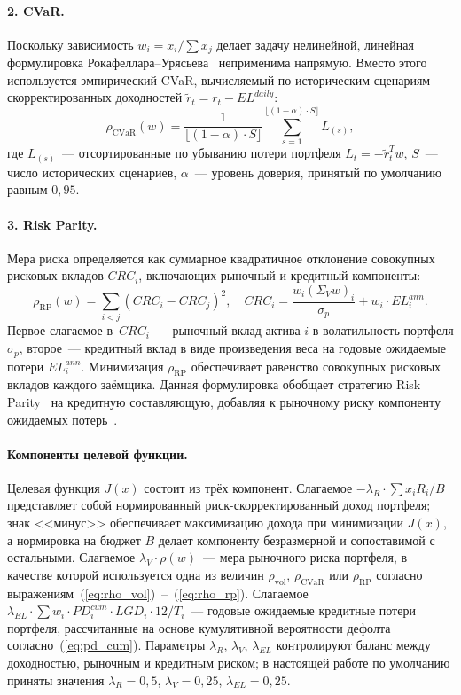 \documentclass[]{article}
\begin{document}
	\paragraph{2. CVaR.}
	Поскольку зависимость $w_i = x_i / \sum x_j$ делает задачу нелинейной, линейная формулировка
	Рокафеллара--Урясьева~\cite{rockafellar2000} неприменима напрямую. Вместо этого используется
	эмпирический CVaR, вычисляемый по историческим сценариям скорректированных доходностей
	$\tilde{r}_t = r_t - EL^{daily}$:
	\begin{equation}
		\label{eq:rho_cvar}
		\rho_{\text{CVaR}}(w) = \frac{1}{\lfloor(1-\alpha) \cdot S\rfloor}
		\sum_{s=1}^{\lfloor(1-\alpha) \cdot S\rfloor} L_{(s)},
	\end{equation}
	где $L_{(s)}$~--- отсортированные по убыванию потери портфеля $L_t = -\tilde{r}_t^T w$,
	$S$~--- число исторических сценариев, $\alpha$~--- уровень доверия, принятый по умолчанию
	равным $0{,}95$.

	\paragraph{3. Risk Parity.}
	Мера риска определяется как суммарное квадратичное отклонение совокупных рисковых вкладов
	$CRC_i$, включающих рыночный и кредитный компоненты:
	\begin{equation}
		\label{eq:rho_rp}
		\rho_{\text{RP}}(w) = \sum_{i<j} \left(CRC_i - CRC_j\right)^2, \quad
		CRC_i = \frac{w_i (\Sigma_V w)_i}{\sigma_p} + w_i \cdot EL_i^{ann}.
	\end{equation}
	Первое слагаемое в~$CRC_i$~--- рыночный вклад актива $i$ в волатильность портфеля
	$\sigma_p$, второе~--- кредитный вклад в виде произведения веса на годовые ожидаемые потери
	$EL_i^{ann}$. Минимизация $\rho_{\text{RP}}$ обеспечивает равенство совокупных рисковых
	вкладов каждого заёмщика. Данная формулировка обобщает стратегию Risk
	Parity~\cite{maillard2010} на кредитную составляющую, добавляя к рыночному риску компоненту
	ожидаемых потерь~\cite{mausser2008}.

	\paragraph{Компоненты целевой функции.}
	Целевая функция $J(x)$ состоит из трёх компонент. Слагаемое $-\lambda_R \cdot \sum x_i R_i / B$
	представляет собой нормированный риск-скорректированный доход портфеля; знак <<минус>>
	обеспечивает максимизацию дохода при минимизации $J(x)$, а нормировка на бюджет $B$ делает
	компоненту безразмерной и сопоставимой с остальными. Слагаемое $\lambda_V \cdot \rho(w)$~---
	мера рыночного риска портфеля, в качестве которой используется одна из величин
	$\rho_{\text{vol}}$, $\rho_{\text{CVaR}}$ или $\rho_{\text{RP}}$ согласно
	выражениям~(\ref{eq:rho_vol})~--~(\ref{eq:rho_rp}). Слагаемое
	$\lambda_{EL} \cdot \sum w_i \cdot PD_i^{cum} \cdot LGD_i \cdot 12 / T_i$~--- годовые
	ожидаемые кредитные потери портфеля, рассчитанные на основе кумулятивной вероятности дефолта
	согласно~(\ref{eq:pd_cum}). Параметры $\lambda_R$, $\lambda_V$, $\lambda_{EL}$ контролируют
	баланс между доходностью, рыночным и кредитным риском; в настоящей работе по умолчанию приняты
	значения $\lambda_R = 0{,}5$, $\lambda_V = 0{,}25$, $\lambda_{EL} = 0{,}25$.
\end{document}
